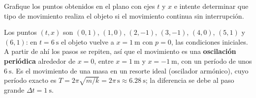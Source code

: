 \documentclass[12pt, a4paper]{article}
\begin{document}
\begin{exercise}[ID=grafica, tags={banco}]
Grafique los puntos obtenidos en el plano con ejes $t$ y $x$ e intente determinar que tipo de movimiento realiza el objeto si el movimiento continua sin interrupción.
\end{exercise}
\begin{solution}
Los puntos $(t,x)$ son $(0,1)$, $(1,0)$, $(2,-1)$, $(3,-1)$, $(4,0)$, $(5,1)$ y $(6,1)$: en $t=\qty{6}{\s}$ el objeto vuelve a $x=\qty{1}{\m}$ con $p=0$, las condiciones iniciales. A partir de ahí los pasos se repiten, así que el movimiento es una \textbf{oscilación periódica} alrededor de $x=0$, entre $x=\qty{1}{\m}$ y $x=\qty{-1}{\m}$, con un período de unos $\qty{6}{\s}$. Es el movimiento de una masa en un resorte ideal (oscilador armónico), cuyo período exacto es $T=2\pi\sqrt{m/k}=2\pi\,\unit{\s}\approx\qty{6.28}{\s}$; la diferencia se debe al paso grande $\Delta t=\qty{1}{\s}$.
\end{solution}
\end{document}
